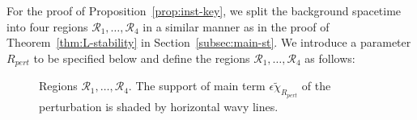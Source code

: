 \documentclass[10pt, reqno]{amsart}
\theoremstyle{definition}
\theoremstyle{remark}
\theoremstyle{conjecture}
\numberwithin{equation}{section}
\newcommand{\0}{\emptyset}
\newcommand{\eps}{\epsilon}
\newcommand{\calR}{\mathcal R}
\begin{document}
For the proof of Proposition~\ref{prop:inst-key}, we split the background spacetime into four regions $\calR_{1}, \ldots, \calR_{4}$ in a similar manner as in the proof of Theorem~\ref{thm:L-stability} in Section~\ref{subsec:main-st}. We introduce a parameter $R_{pert}$ to be specified below and define the regions $\calR_{1}, \ldots, \calR_{4}$ as follows:

\begin{figure}[h]
\begin{center}
\def\svgwidth{300px}
 
\caption{Regions $\calR_{1}, \ldots, \calR_{4}$. The support of main term $\eps \tilde{\chi}_{R_{pert}}$ of the perturbation is shaded by horizontal wavy lines.} \label{fig:L-inst-key}
\end{center}
\end{figure}
\end{document}
